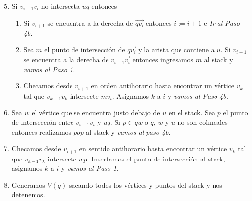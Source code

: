 \documentclass[aspectratio=169,xcolor=dvipsnames, t]{beamer}
\begin{document}
\begin{frame}{}
  \begin{enumerate}
    \setcounter{enumi}{4} 
  \item Si $v_{i-1}v_{i}$ no intersecta $uq$ entonces
    \begin{enumerate}
    \item Si $v_{i+1}$ se encuentra a la derecha de $\overrightarrow{qv_{i}}$ entonces $i := i + 1$ e \textit{Ir al Paso 4b.}
    \item Sea $m$ el punto de intersección de $\overrightarrow{qv_{i}}$ y la arista que contiene a $u$. Si $v_{i+1}$ se encuentra a la derecha de $\overrightarrow{v_{i-1}v_{i}}$ entonces ingresamos $m$ al stack y \textit{vamos al Paso 1.}
    \item Checamos desde $v_{i+1}$ en orden antihorario hasta encontrar un vértice $v_{k}$ tal que $v_{k-1}v_{k}$ intersecte $mv_{i}$. Asignamos $k$ a $i$ y \textit{vamos al Paso 4b.}
    \end{enumerate}
  \item Sea $w$ el vértice que se encuentra justo debajo de $u$ en el stack. Sea $p$ el punto de intersección entre $v_{i-1}v_{i}$ y $uq$. Si $p \in qw$ o $q$, $w$ y $u$ no son colineales entonces realizamos \textit{pop} al stack y \textit{vamos al paso 4b}.
  \item Checamos desde $v_{i+1}$ en sentido antihorario hasta encontrar un vértice $v_{k}$ tal que $v_{k-1}v_{k}$ intersecte $wp$. Insertamos el punto de intersección al stack, asignamos $k$ a $i$ y \textit{vamos al Paso 1.}
  \item Generamos $V(q)$ sacando todos los vértices y puntos del stack y nos detenemos.
  \end{enumerate}
\end{frame}



\end{document}
